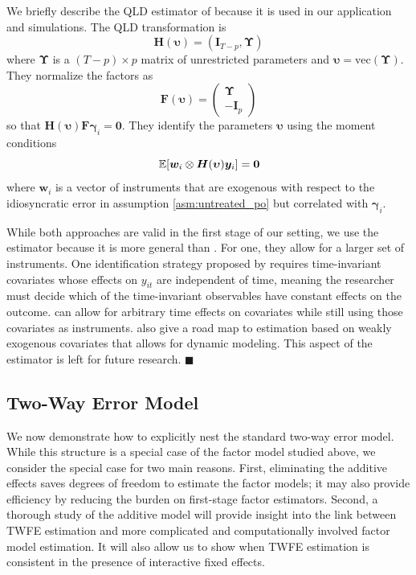 \documentclass[12pt]{article}
\begin{document}
\begin{remark}\label{remark:QLD}
We briefly describe the QLD estimator of \citet{Ahn_Lee_Schmidt_2013} because it is used in our application and simulations. The QLD transformation is 
  \begin{equation}
  \bm H(\bm \upsilon) = (\bm I_{T-p}, \bm \Upsilon)
\end{equation}
where $\bm \Upsilon$ is a $(T-p) \times p$ matrix of unrestricted parameters and $\bm \upsilon = \text{vec}(\bm \Upsilon)$. They normalize the factors as 
\begin{equation}
  \bm F(\bm \upsilon) = 
  \begin{pmatrix}
    \bm \Upsilon\\
    -\bm I_p
  \end{pmatrix}
\end{equation}
so that $\bm H(\bm \upsilon) \bm F \bm \gamma_i = \bm 0$. They identify the parameters $\bm \upsilon$ using the moment conditions 
\begin{equation}
  \expec{\bm w_i \otimes \bm H(\bm \upsilon) \bm y_i} = \bm 0
\end{equation}
where $\bm w_i$ is a vector of instruments that are exogenous with respect to the idiosyncratic error in assumption \ref{asm:untreated_po} but correlated with $\bm \gamma_i$.

While both approaches are valid in the first stage of our setting, we use the \citet{Ahn_Lee_Schmidt_2013} estimator because it is more general than \citet{Callaway_Karami_2020}. For one, they allow for a larger set of instruments. One identification strategy proposed by \citet{Callaway_Karami_2020} requires time-invariant covariates whose effects on $y_{it}$ are independent of time, meaning the researcher must decide which of the time-invariant observables have constant effects on the outcome. \citet{Ahn_Lee_Schmidt_2013} can allow for arbitrary time effects on covariates while still using those covariates as instruments. \citet{Ahn_Lee_Schmidt_2013} also give a road map to estimation based on weakly exogenous covariates that allows for dynamic modeling. This aspect of the estimator is left for future research.
$\blacksquare$
\end{remark}


\subsection{Two-Way Error Model}

We now demonstrate how to explicitly nest the standard two-way error model. While this structure is a special case of the factor model studied above, we consider the special case for two main reasons. First, eliminating the additive effects saves degrees of freedom to estimate the factor models; it may also provide efficiency by reducing the burden on first-stage factor estimators. Second, a thorough study of the additive model will provide insight into the link between TWFE estimation and more complicated and computationally involved factor model estimation. It will also allow us to show when TWFE estimation is consistent in the presence of interactive fixed effects. 
\end{document}
